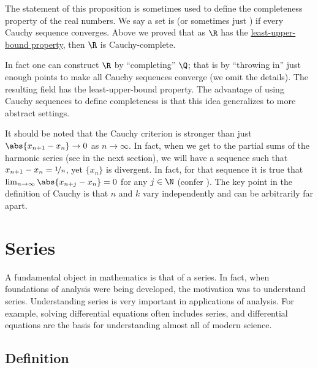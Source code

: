 \documentclass[12pt]{book}
\begin{document}
\begin{remark}
The statement of this proposition is sometimes used to define the
completeness property of the real numbers.
We say a set is
\emph{} (or sometimes just \emph{})
if every Cauchy sequence converges.
Above we proved that
as $\R$ has the \hyperref[defn:lub]{least-upper-bound property}, then $\R$ is 
Cauchy-complete.

In fact one can construct $\R$ by ``completing'' $\Q$;
that is by ``throwing in'' just enough points to make all
Cauchy sequences converge (we omit the details).
The resulting field has the
least-upper-bound property.
The advantage of using Cauchy
sequences to define completeness is that this idea generalizes to
more abstract settings.
\end{remark}

It should be noted that the Cauchy criterion is stronger than just
$\abs{x_{n+1}-x_n}\to0$ as $n\to\infty$.
In fact, when we get to the partial sums of the harmonic series
(see  in the next section), we will have
a sequence such that $x_{n+1}-x_n = \nicefrac{1}{n}$, yet $\{ x_n \}$ is
divergent.
In fact, for that sequence it is true
that $\lim_{n\to\infty} \abs{x_{n+j}-x_n} = 0$ for
any $j \in \N$ (confer ).
The key point in the definition of Cauchy is that $n$ and $k$
vary independently and can be arbitrarily far apart.







\sectionnewpage
\section{Series}
\label{sec:series}


A fundamental object in mathematics is that of a series.
In fact, when
foundations of analysis were being developed, the motivation was to
understand series.
Understanding series is very important in applications
of analysis.
For example, solving differential equations often includes
series, and differential equations are the basis for understanding
almost all of modern science.

\subsection*{Definition}
\end{document}
